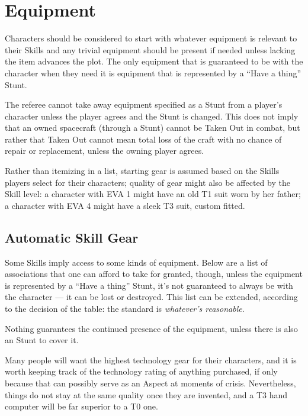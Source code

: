 \section{Equipment}
\label{sec:Equipment}

Characters should be considered to start with whatever equipment is relevant to their Skills and any trivial equipment should be present if needed unless lacking the item advances the plot. The only equipment that is guaranteed to be with the character when they need it is equipment that is represented by a ``Have a thing'' Stunt.

The referee cannot take away equipment specified as a Stunt from a player's character unless the player agrees and the Stunt is changed. This does not imply that an owned spacecraft (through a Stunt) cannot be Taken Out in combat, but rather that Taken Out cannot mean total loss of the craft with no chance of repair or replacement, unless the owning player agrees.

Rather than itemizing in a list, starting gear is assumed based on the Skills players select for their characters; quality of gear might also be affected by the Skill level: a character with EVA 1 might have an old T1 suit worn by her father; a character with EVA 4 might have a sleek T3 suit, custom fitted.

\subsection{Automatic Skill Gear}
\label{sec:automatic-skill-gear}



Some Skills imply access to some kinds of equipment. Below are a list of associations that one can afford to take for granted, though, unless the equipment is represented by a ``Have a thing'' Stunt, it's not guaranteed to always be with the character --- it can be lost or destroyed. This list can be extended, according to the decision of the table: the standard is \emph{whatever's reasonable}.

Nothing guarantees the continued presence of the equipment, unless there is also an Stunt to cover it.

Many people will want the highest technology gear for their characters, and it is worth keeping track of the technology rating of anything purchased, if only because that can possibly serve as an Aspect at moments of crisis. Nevertheless, things do not stay at the same quality once they are invented, and a T3 hand computer will be far superior to a T0 one.

